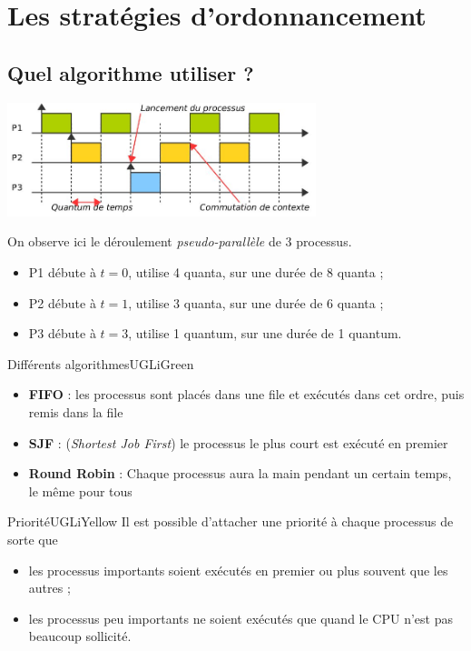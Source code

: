 \documentclass[10pt,firamath,cours]{nsi}
\begin{document}
\section{Les stratégies d'ordonnancement}

\subsection{Quel algorithme utiliser ?}
\begin{center}
\includegraphics[width=9cm]{img/3proc}
\end{center}
On observe ici le déroulement \textit{pseudo-parallèle} de 3 processus.
\begin{itemize}
	\item P1 débute à $t=0$, utilise 4 quanta, sur une durée de 8 quanta ;
    \item P2 débute à $t=1$, utilise 3 quanta, sur une durée de 6 quanta ;
    \item P3 débute à $t=3$, utilise 1 quantum, sur une durée de 1 quantum.
\end{itemize}

\begin{encadrecolore}{Différents algorithmes}{UGLiGreen}
    \begin{itemize}
        \item \textbf{FIFO} : les processus sont placés dans une file et exécutés dans cet ordre, puis remis dans la file
        \item \textbf{SJF} : (\textit{Shortest Job First}) le processus le plus court est exécuté en premier
        \item \textbf{Round Robin} : Chaque processus aura la main pendant un certain temps, le même pour tous
    \end{itemize}        
\end{encadrecolore}

\begin{encadrecolore}{Priorité}{UGLiYellow}
Il est possible d'attacher une priorité à chaque processus de sorte que
\begin{itemize}
	\item les processus importants soient exécutés en premier ou plus souvent que les autres ;
    \item les processus peu importants ne soient exécutés que quand le CPU n'est pas beaucoup sollicité.
\end{itemize}
\end{encadrecolore}
\end{document}

